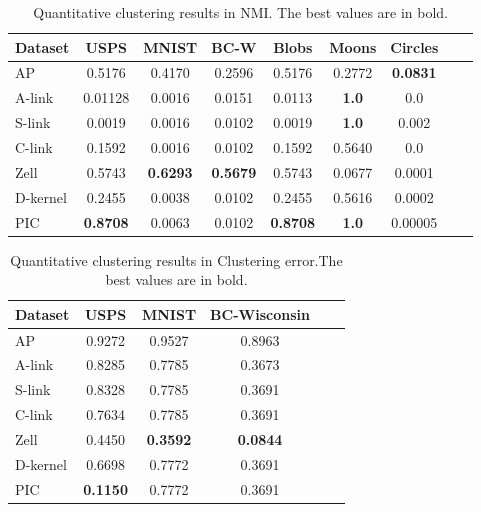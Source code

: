 \documentclass[
	10pt,
	parskip=half-,	
	paper=a4,
	english
	]{scrartcl}
\begin{document}
\begin{table}[h]
    \centering
    \caption{Quantitative clustering results in NMI. The best values are in bold.}
    \begin{tabular}{lcccccccc}
    \toprule
    \textbf{Dataset} & \textbf{USPS} & \textbf{MNIST} & \textbf{BC-W} & \textbf{Blobs} & \textbf{Moons} & \textbf{Circles} \\
    \midrule
    AP       & 0.5176   & 0.4170 & 0.2596 & 0.5176  & 0.2772 & \textbf{0.0831} \\
    A-link   & 0.01128  & 0.0016 & 0.0151 & 0.0113  & \textbf{1.0} & 0.0 \\
    S-link   & 0.0019   & 0.0016 & 0.0102 & 0.0019  & \textbf{1.0} & 0.002 \\
    C-link   & 0.1592   & 0.0016 & 0.0102 & 0.1592  & 0.5640 & 0.0 \\
    Zell     & 0.5743   & \textbf{0.6293} & \textbf{0.5679} & 0.5743   & 0.0677 & 0.0001 \\
    D-kernel & 0.2455   & 0.0038 & 0.0102 & 0.2455   & 0.5616 & 0.0002 \\
    PIC & \textbf{0.8708} & 0.0063 & 0.0102 & \textbf{0.8708}   & \textbf{1.0} & 0.00005 \\
    \bottomrule
    \end{tabular}
    \label{tab:synthetic_results}
\end{table}

\begin{table}[h]
    \centering
    \caption{Quantitative clustering results in Clustering error.The best values are in bold.}
    \begin{tabular}{lccccc}
    \toprule
    \textbf{Dataset} & \textbf{USPS} & \textbf{MNIST} & \textbf{BC-Wisconsin} \\
    \midrule
    AP       & 0.9272   & 0.9527 & 0.8963\\
    A-link   & 0.8285  & 0.7785 & 0.3673  \\
    S-link   & 0.8328   & 0.7785 & 0.3691\\
    C-link   & 0.7634   & 0.7785 & 0.3691\\
    Zell     & 0.4450   & \textbf{0.3592} & \textbf{0.0844}\\
    D-kernel & 0.6698   & 0.7772 & 0.3691\\
    PIC & \textbf{0.1150} & 0.7772 & 0.3691 \\
    \bottomrule
    \end{tabular}
\end{table}
\end{document}
